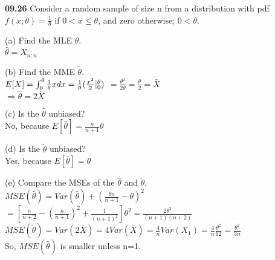 { \bf 09.26 }
Consider a random sample of size n from a distribution with pdf \\
$f(x;\theta)=\frac{1}{\theta}$ if $0<x\leq\theta$, and zero otherwise; $0<\theta.$

(a) Find the MLE $\hat{\theta}$.\\
  \-\hspace{1cm} $\hat{\theta}=X_{n:n}$ 

(b) Find the MME $\tilde{\theta}$.\\
  \-\hspace{1cm}    $E[X]=\int_{0}^{\theta}\frac{1}{\theta}x dx = \frac{1}{\theta}(\frac{x^2}{2}|^\theta _0)\\ $ \-\hspace{2cm} $=\frac{\theta^2}{2\theta} =\frac{\theta}{2}=\bar{X}$\\
   \-\hspace{2cm} $\Rightarrow \hat{\theta}=2\bar{X}$

(c) Is the $\hat{\theta}$ unbiased?\\
   \-\hspace{1cm} No, because $E[\hat{\theta}]=\frac{n}{n + 1}\theta$

(d) Is the $\tilde{\theta}$ unbiased?\\
    \-\hspace{1cm}Yes, because $E[\bar{\theta}]=\theta$
    
(e) Compare the MSEs of the $\hat{\theta}$ and $\tilde{\theta}$.\\
 \-\hspace{1cm} $MSE(\hat{\theta})= Var(\hat{\theta})+(\frac{\theta n}{n + 1}-\theta)^2$\\
  \-\hspace{2cm} $= [\frac{n}{n+2}-(\frac{n}{n+1})^2+\frac{1}{(n+1)^2}]\theta^2 = \frac{2\theta^2}{(n+1)(n+2)}$\\
 \-\hspace{1cm} $MSE(\tilde{\theta})= Var(2\bar{X})= 4Var(\bar{X})=\frac{4}{n}Var(X_1)=\frac{4}{n}\frac{\theta^2}{12}=\frac{\theta^2}{3n}$\\
 \-\hspace{1cm} So, $MSE(\hat{\theta})$ is smaller unless n=1.




